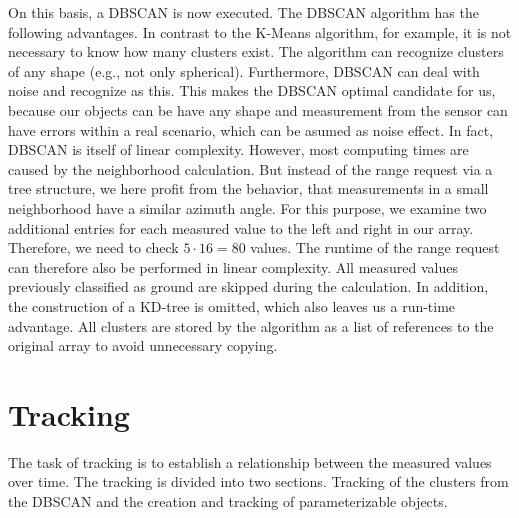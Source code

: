 \documentclass[11pt,oneside,openright]{mpreport}
\begin{document}
On this basis, a \ac{DBSCAN} \cite{DBSCAN} is now executed. The \ac{DBSCAN} algorithm has the following advantages. In contrast to the K-Means algorithm,
for example, it is not necessary to know how many clusters exist. The algorithm can recognize clusters of any shape (e.g., not only spherical).
Furthermore, \ac{DBSCAN} can deal with noise and recognize as this. This makes the \ac{DBSCAN} optimal candidate for us, because our objects can be have any shape and 
measurement from the sensor can have errors within a real scenario, which can be asumed as noise effect. 
In fact, \ac{DBSCAN} is itself of linear complexity. However, most computing times are caused by the neighborhood calculation.
But instead of the range request via a tree structure, we here profit from the behavior, that measurements in a small neighborhood have a similar azimuth angle.
For this purpose, we examine two additional entries for each measured value to the left and right in our array. 
Therefore, we need to check $5 \cdot 16 = 80$ values. The runtime of the range request can therefore also be performed in linear complexity. 
All measured values previously classified as ground are skipped during the calculation. In addition, the construction of a KD-tree is omitted, which also leaves us a run-time advantage.
All clusters are stored by the algorithm as a list of references to the original array to avoid unnecessary copying.


\section{Tracking}
\label{tracking}
The task of tracking is to establish a relationship between the measured values over time. The tracking is divided into two sections.
Tracking of the clusters from the \ac{DBSCAN} and the creation and tracking of parameterizable objects.
\end{document}

